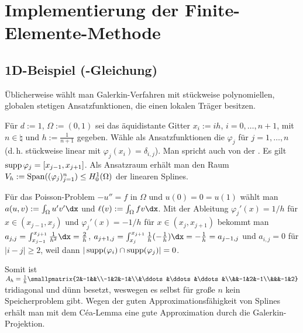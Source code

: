 \section{%
    Implementierung der Finite-Elemente-Methode%
}

\subsection{%
    1D-Beispiel (-Gleichung)%
}

\begin{Bem}
    Üblicherweise wählt man Galerkin-Verfahren mit
    stückweise polynomiellen, globalen stetigen Ansatzfunktionen, die einen lokalen Träger
    besitzen.
\end{Bem}

\begin{Bsp}
    Für $d := 1$, $\Omega := (0, 1)$
    sei das äquidistante Gitter
    $x_i := ih$, $i = 0, \dotsc, n + 1$, mit $n \in \natural$ und $h := \frac{1}{n+1}$ gegeben.
    Wähle als Ansatzfunktionen die 
    $\varphi_j$ für $j = 1, \dotsc, n$
    (d.\,h. stückweise linear mit $\varphi_j(x_i) = \delta_{i,j}$).
    Man spricht auch von der .
    Es gilt $\operatorname{supp}\varphi_j = [x_{j-1}, x_{j+1}]$.
    Als Ansatzraum erhält man den Raum $V_h := \operatorname{Span}((\varphi_j)_{j=1}^n) \le H^1_0(\Omega)$
    der linearen Splines.

    Für das Poisson-Problem $-u'' = f$ in $\Omega$ und $u(0) = 0 = u(1)$ wählt man
    $a(u, v) := \int_\Omega u'v'\dx$ und $\ell(v) := \int_\Omega fv\dx$.
    Mit der Ableitung $\varphi_j'(x) = 1/h$ für $x \in (x_{j-1}, x_j)$ und
    $\varphi_j'(x) = -1/h$ für $x \in (x_j, x_{j+1})$ bekommt man
    $a_{j,j} = \int_{x_{j-1}}^{x_{j+1}} \frac{1}{h^2} \dx = \frac{2}{h}$,
    $a_{j+1,j} = \int_{x_j}^{x_{j+1}} \frac{1}{h} (-\frac{1}{h}) \dx = -\frac{1}{h} = a_{j-1,j}$
    und $a_{i,j} = 0$ für $|i - j| \ge 2$, weil dann
    $|\operatorname{supp}(\varphi_i) \cap \operatorname{supp}(\varphi_j)| = 0$.

    Somit ist $A_h = \frac{1}{h}
    \smallpmatrix{2&-1&&\\-1&2&-1&\\&\ddots&\ddots&\ddots&\\&&-1&2&-1\\&&&-1&2}$
    tridiagonal und dünn besetzt,
    weswegen es selbst für große $n$ kein Speicherproblem gibt.
    Wegen der guten Approximationsfähigkeit von Splines erhält man mit dem
    Céa-Lemma eine gute Approximation durch die Galerkin-Projektion.
\end{Bsp}

